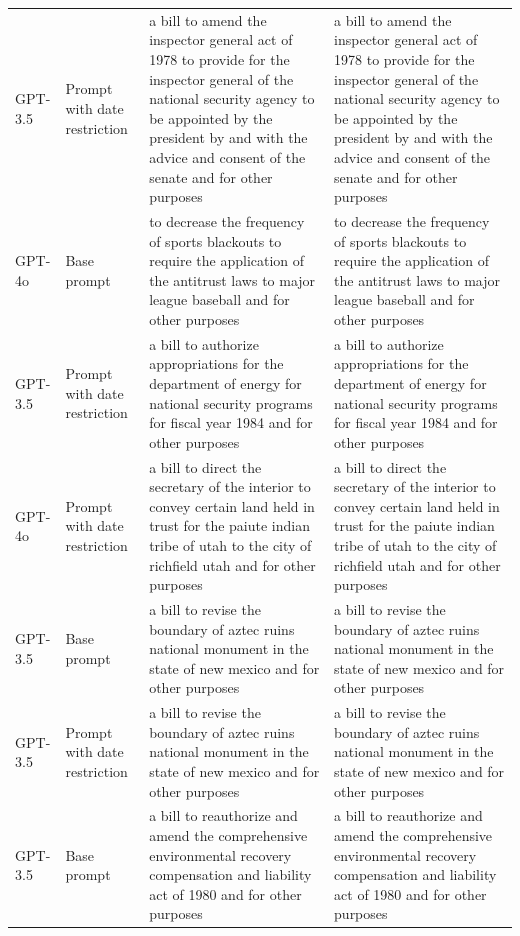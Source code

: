 \begin{longtable}{>{\raggedright\arraybackslash}p{1.4cm}>{\raggedright\arraybackslash}p{1.4cm}>{\raggedright\arraybackslash}p{5.5cm}>{\raggedright\arraybackslash}p{5.5cm}}
GPT-3.5 & Prompt with date restriction & a bill to amend the inspector general act of 1978 to provide for the inspector general of the national security agency to be appointed by the president by and with the advice and consent of the senate and for other purposes & a bill to amend the inspector general act of 1978 to provide for the inspector general of the national security agency to be appointed by the president by and with the advice and consent of the senate and for other purposes\\
GPT-4o & Base prompt & to decrease the frequency of sports blackouts to require the application of the antitrust laws to major league baseball and for other purposes & to decrease the frequency of sports blackouts to require the application of the antitrust laws to major league baseball and for other purposes\\
GPT-3.5 & Prompt with date restriction & a bill to authorize appropriations for the department of energy for national security programs for fiscal year 1984 and for other purposes & a bill to authorize appropriations for the department of energy for national security programs for fiscal year 1984 and for other purposes\\
GPT-4o & Prompt with date restriction & a bill to direct the secretary of the interior to convey certain land held in trust for the paiute indian tribe of utah to the city of richfield utah and for other purposes & a bill to direct the secretary of the interior to convey certain land held in trust for the paiute indian tribe of utah to the city of richfield utah and for other purposes\\
GPT-3.5 & Base prompt & a bill to revise the boundary of aztec ruins national monument in the state of new mexico and for other purposes & a bill to revise the boundary of aztec ruins national monument in the state of new mexico and for other purposes\\
GPT-3.5 & Prompt with date restriction & a bill to revise the boundary of aztec ruins national monument in the state of new mexico and for other purposes & a bill to revise the boundary of aztec ruins national monument in the state of new mexico and for other purposes\\
GPT-3.5 & Base prompt & a bill to reauthorize and amend the comprehensive environmental recovery compensation and liability act of 1980 and for other purposes & a bill to reauthorize and amend the comprehensive environmental recovery compensation and liability act of 1980 and for other purposes\\

\end{longtable}
